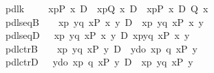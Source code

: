 \begin{isabellebody}
\ \ pdl{\isacharunderscore}k{}{\isacharcolon}\ \ \ \ {\isachardoublequote}{\isasymturnstile}\ {\isacharparenleft}{\isasymlangle}x{\isasymleftarrow}p{\isasymrangle}{\isacharparenleft}P\ x{\isacharparenright}\ {\isasymlongrightarrow}\isactrlsub D\ {\isacharbrackleft}{\isacharhash}\ x{\isasymleftarrow}p{\isacharbrackright}{\isacharparenleft}Q\ x{\isacharparenright}{\isacharparenright}\ {\isasymlongrightarrow}\isactrlsub D\ {\isacharbrackleft}{\isacharhash}\ x{\isasymleftarrow}p{\isacharbrackright}{\isacharparenleft}P\ x\ {\isasymlongrightarrow}\isactrlsub D\ Q\ x{\isacharparenright}{\isachardoublequote}\isanewline
\ \ pdl{\isacharunderscore}seqB{\isacharcolon}\ \ {\isachardoublequote}{\isasymturnstile}\ {\isacharbrackleft}{\isacharhash}\ x{\isasymleftarrow}p{\isacharsemicolon}\ y{\isasymleftarrow}q\ x{\isacharbrackright}{\isacharparenleft}P\ x\ y{\isacharparenright}\ {\isasymlongleftrightarrow}\isactrlsub D\ {\isacharbrackleft}{\isacharhash}\ x{\isasymleftarrow}p{\isacharbrackright}{\isacharbrackleft}{\isacharhash}\ y{\isasymleftarrow}q\ x{\isacharbrackright}{\isacharparenleft}P\ x\ y{\isacharparenright}{\isachardoublequote}\isanewline
\ \ pdl{\isacharunderscore}seqD{\isacharcolon}\ \ {\isachardoublequote}{\isasymturnstile}\ {\isasymlangle}x{\isasymleftarrow}p{\isacharsemicolon}\ y{\isasymleftarrow}q\ x{\isasymrangle}{\isacharparenleft}P\ x\ y{\isacharparenright}\ {\isasymlongleftrightarrow}\isactrlsub D\ {\isasymlangle}x{\isasymleftarrow}p{\isasymrangle}{\isasymlangle}y{\isasymleftarrow}q\ x{\isasymrangle}{\isacharparenleft}P\ x\ y{\isacharparenright}{\isachardoublequote}\isanewline
\ \ pdl{\isacharunderscore}ctrB{\isacharcolon}\ \ {\isachardoublequote}{\isasymturnstile}\ {\isacharbrackleft}{\isacharhash}\ x{\isasymleftarrow}p{\isacharsemicolon}\ y{\isasymleftarrow}q\ x{\isacharbrackright}{\isacharparenleft}P\ y{\isacharparenright}\ {\isasymlongrightarrow}\isactrlsub D\ {\isacharbrackleft}{\isacharhash}\ y{\isasymleftarrow}do\ {\isacharbraceleft}x{\isasymleftarrow}p{\isacharsemicolon}\ q\ x{\isacharbraceright}{\isacharbrackright}{\isacharparenleft}P\ y{\isacharparenright}{\isachardoublequote}\isanewline
\ \ pdl{\isacharunderscore}ctrD{\isacharcolon}\ \ {\isachardoublequote}{\isasymturnstile}\ {\isasymlangle}y{\isasymleftarrow}do\ {\isacharbraceleft}x{\isasymleftarrow}p{\isacharsemicolon}\ q\ x{\isacharbraceright}{\isasymrangle}{\isacharparenleft}P\ y{\isacharparenright}\ {\isasymlongrightarrow}\isactrlsub D\ \ {\isasymlangle}x{\isasymleftarrow}p{\isacharsemicolon}\ y{\isasymleftarrow}q\ x{\isasymrangle}{\isacharparenleft}P\ y{\isacharparenright}{\isachardoublequote}\isanewline

\end{isabellebody}
